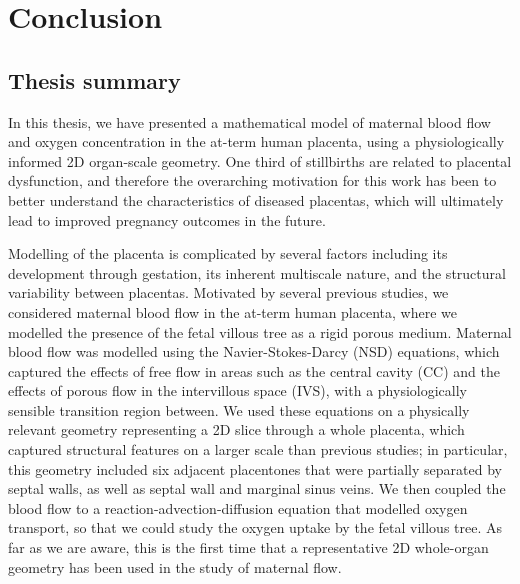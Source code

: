 \chapter{Conclusion} \label{sec:conclusions}
    \section{Thesis summary}    
        In this thesis, we have presented a mathematical model of maternal blood flow and oxygen concentration in the at-term human placenta, using a physiologically informed 2D organ-scale geometry. One third of stillbirths are related to placental dysfunction, and therefore the overarching motivation for this work has been to better understand the characteristics of diseased placentas, which will ultimately lead to improved pregnancy outcomes in the future.

        Modelling of the placenta is complicated by several factors including its development through gestation, its inherent multiscale nature, and the structural variability between placentas. Motivated by several previous studies, we considered maternal blood flow in the at-term human placenta, where we modelled the presence of the fetal villous tree as a rigid porous medium. Maternal blood flow was modelled using the Navier-Stokes-Darcy (NSD) equations, which captured the effects of free flow in areas such as the central cavity (CC) and the effects of porous flow in the intervillous space (IVS), with a physiologically sensible transition region between. We used these equations on a physically relevant geometry representing a 2D slice through a whole placenta, which captured structural features on a larger scale than previous studies; in particular, this geometry included six adjacent placentones that were partially separated by septal walls, as well as septal wall and marginal sinus veins. We then coupled the blood flow to a reaction-advection-diffusion equation that modelled oxygen transport, so that we could study the oxygen uptake by the fetal villous tree. As far as we are aware, this is the first time that a representative 2D whole-organ geometry has been used in the study of maternal flow.

